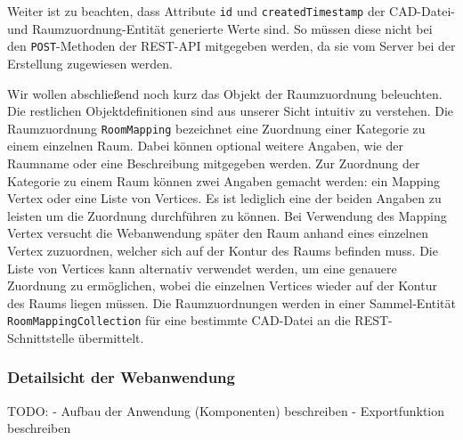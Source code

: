 Weiter ist zu beachten, dass Attribute \texttt{id} und \texttt{createdTimestamp} der CAD-Datei- und Raumzuordnung-Entität generierte Werte sind.
So müssen diese nicht bei den \texttt{POST}-Methoden der REST-API mitgegeben werden, da sie vom Server bei der Erstellung zugewiesen werden.

Wir wollen abschließend noch kurz das Objekt der Raumzuordnung beleuchten.
Die restlichen Objektdefinitionen sind aus unserer Sicht intuitiv zu verstehen.
Die Raumzuordnung \texttt{RoomMapping} bezeichnet eine Zuordnung einer Kategorie zu einem einzelnen Raum.
Dabei können optional weitere Angaben, wie der Raumname oder eine Beschreibung mitgegeben werden.
Zur Zuordnung der Kategorie zu einem Raum können zwei Angaben gemacht werden: ein Mapping Vertex oder eine Liste von Vertices.
Es ist lediglich eine der beiden Angaben zu leisten um die Zuordnung durchführen zu können.
Bei Verwendung des Mapping Vertex versucht die Webanwendung später den Raum anhand eines einzelnen Vertex zuzuordnen, welcher sich auf der Kontur des Raums befinden muss.
Die Liste von Vertices kann alternativ verwendet werden, um eine genauere Zuordnung zu ermöglichen, wobei die einzelnen Vertices wieder auf der Kontur des Raums liegen müssen.
Die Raumzuordnungen werden in einer Sammel-Entität \texttt{RoomMappingCollection} für eine bestimmte CAD-Datei an die REST-Schnittstelle übermittelt.

\subsubsection{Detailsicht der Webanwendung}
\label{subsubsec:detail-webapp}

TODO:
- Aufbau der Anwendung (Komponenten) beschreiben
- Exportfunktion beschreiben
